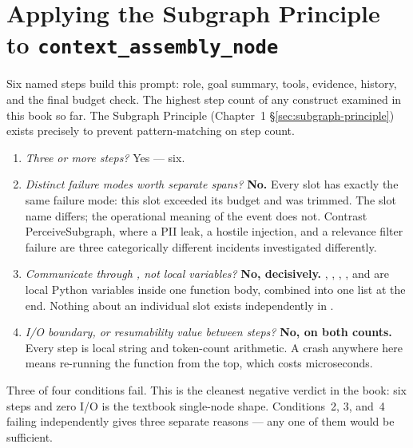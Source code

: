 \section{Applying the Subgraph Principle to \texttt{context\_assembly\_node}}
\label{sec:ch6-subgraph}

Six named steps build this prompt: role, goal summary, tools, evidence,
history, and the final budget check.  The highest step count of any
construct examined in this book so far.  The Subgraph Principle
(Chapter~1 §\ref{sec:subgraph-principle}) exists precisely to prevent
pattern-matching on step count.

\begin{takeawaybox}
\begin{enumerate}
  \item \emph{Three or more steps?}  Yes --- six.
  \item \emph{Distinct failure modes worth separate spans?}
        \textbf{No.}  Every slot has exactly the same failure mode: this
        slot exceeded its budget and was trimmed.  The slot name differs;
        the operational meaning of the event does not.  Contrast
        PerceiveSubgraph, where a PII leak, a hostile injection, and a
        relevance filter failure are three categorically different
        incidents investigated differently.
  \item \emph{Communicate through , not local variables?}
        \textbf{No, decisively.}  ,
        , , ,
        and  are local Python variables inside one
        function body, combined into one list at the end.  Nothing about
        an individual slot exists independently in .
  \item \emph{I/O boundary, or resumability value between steps?}
        \textbf{No, on both counts.}  Every step is local string and
        token-count arithmetic.  A crash anywhere here means
        re-running the function from the top, which costs microseconds.
\end{enumerate}
Three of four conditions fail.  This is the cleanest negative verdict in
the book: six steps and zero I/O is the textbook single-node shape.
Conditions~2, 3, and~4 failing independently gives three separate
reasons --- any one of them would be sufficient.
\end{takeawaybox}

